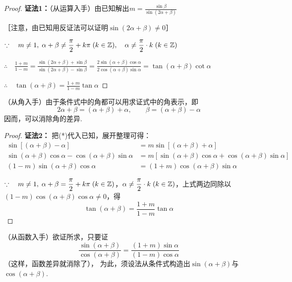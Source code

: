 \begin{proof}
\textbf{证法1：}（从运算入手）由已知解出$m=\frac{\sin\beta}{\sin(2\alpha+\beta)}$ 

［注意，由已知用反证法可以证明$\sin(2\alpha+\beta)\ne 0$］

$\because\quad m\ne 1,\; \alpha+\beta\ne \dfrac{\pi}{2}+k\pi\; (k\in\mathbb{Z}),\quad \alpha\ne \dfrac{\pi}{2}\cdot k\; (k\in\mathbb{Z})$

$\therefore\quad \frac{1+m}{1-m}=\frac{\sin(2\alpha+\beta)+\sin\beta}{\sin(2\alpha+\beta)-\sin\beta}=\frac{2\sin(\alpha+\beta)\cos\alpha}{2\cos(\alpha+\beta)\sin\alpha}=\tan(\alpha+\beta)\cot\alpha$

$\therefore\quad \tan(\alpha+\beta)=\frac{1+m}{1-m}\tan\alpha$
\end{proof}

\begin{analyze}
（从角入手）由于条件式中的角都可以用求证式中的角表示，即
\begin{equation}
    2\alpha+\beta=(\alpha+\beta)+\alpha,\qquad \beta=(\alpha+\beta)-\alpha \tag{*}
\end{equation}
因而，可以消除角的差异.
\end{analyze}

\begin{proof}
\textbf{证法2：} 把(*)代入已知，展开整理可得：
\[\begin{split}
\sin[(\alpha+\beta)-\alpha]&=m\sin[(\alpha+\beta)+\alpha]\\
\sin(\alpha+\beta)\cos\alpha-\cos(\alpha+\beta)\sin\alpha&=m[\sin(\alpha+\beta)\cos\alpha+\cos(\alpha+\beta)\sin\alpha]\\
(1-m)\sin(\alpha+\beta)\cos\alpha&=(1+m)\cos(\alpha+\beta)\sin\alpha
\end{split}\]

$\because\quad m\ne 1,\; \alpha+\beta=\dfrac{\pi}{2}+k\pi\; (k\in\mathbb{Z})$，$\alpha\ne \dfrac{\pi}{2}\cdot k\; (k\in\mathbb{Z})$，上式两边同除以$(1-m)\cos(\alpha+\beta)\cos\alpha\ne 0$，得
    \[\tan(\alpha+\beta)=\frac{1+m}{1-m}\tan\alpha\]
\end{proof}

\begin{analyze}
    （从函数入手）欲证所求，只要证
\begin{equation}
    \frac{\sin(\alpha+\beta)}{\cos(\alpha+\beta)}=\frac{(1+m)\sin\alpha}{(1-m)\cos\alpha}\tag{1}
\end{equation}
（这样，函数差异就消除了），
为此，须设法从条件式构造出$\sin(\alpha+\beta)$与$\cos(\alpha+\beta)$.
\end{analyze}

